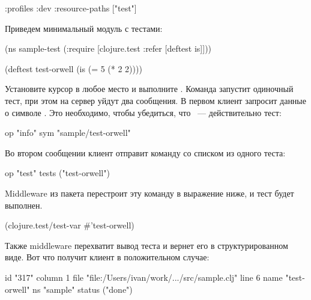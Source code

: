 \begin{english}
  \begin{clojure}
{:profiles
 {:dev
  {:resource-paths ["test"]}}}
  \end{clojure}
\end{english}

Приведем минимальный модуль с тестами:

\begin{english}
  \begin{clojure}
(ns sample-test
  (:require
   [clojure.test :refer [deftest is]]))

(deftest test-orwell
  (is (= 5 (* 2 2))))
  \end{clojure}
\end{english}

Установите курсор в любое место  и выполните . Команда запустит одиночный тест, при этом на сервер уйдут два сообщения. В первом клиент запросит данные о символе . Это необходимо, чтобы убедиться, что ~--- действительно тест:

\begin{english}
  \begin{text}
  op   "info"
  sym  "sample/test-orwell"
  \end{text}
\end{english}

Во втором сообщении клиент отправит команду  со списком из одного теста:

\begin{english}
  \begin{text}
  op     "test"
  tests  ("test-orwell")
  \end{text}
\end{english}

Middleware из пакета  перестроит эту команду в выражение ниже, и тест будет выполнен.

\begin{english}
  \begin{clojure}
(clojure.test/test-var #'test-orwell)
  \end{clojure}
\end{english}

Также middleware перехватит вывод теста и вернет его в структурированном виде. Вот что получит клиент в положительном случае:

\begin{english}
  \begin{text}
  id      "317"
  column  1
  file    "file:/Users/ivan/work/.../src/sample.clj"
  line    6
  name    "test-orwell"
  ns      "sample"
  status  ("done")
  \end{text}
\end{english}

